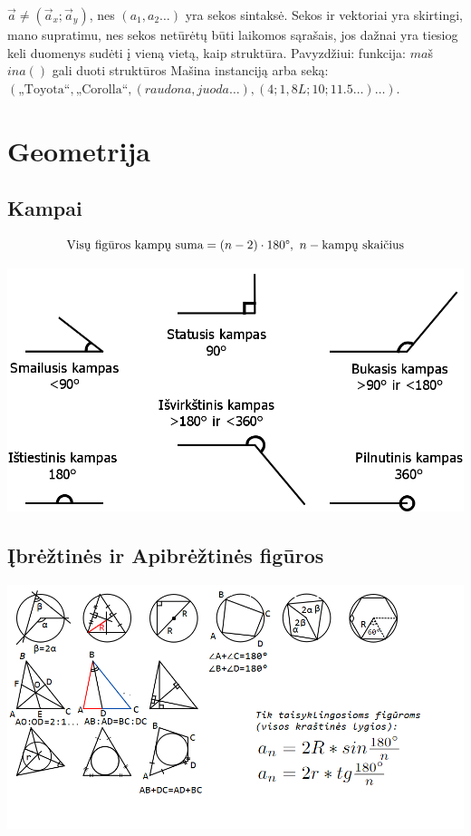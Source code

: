 \documentclass[fleqn]{article} %
\begin{document}
$\vec{a} \ne (\vec{a}_x; \vec{a}_y)$, nes $(a_1, a_2 \dots )$ yra sekos sintaksė. 
Sekos ir vektoriai yra skirtingi, mano supratimu, nes sekos netūrėtų būti laikomos sąrašais, jos dažnai yra tiesiog keli duomenys sudėti į vieną vietą, kaip struktūra. 
Pavyzdžiui: funkcija: $ma$š$ina()$ gali duoti struktūros Mašina instanciją arba seką: 
$(\text{„Toyota“}, \text{„Corolla“}, (raudona, juoda \dots), (4; 1,8L; 10; 11.5 \dots) \dots)$.

\clearpage

\section{Geometrija}

\subsection{Kampai}

\begin{equation}
    \text{Visų figūros kampų suma} = (n - 2) \cdot 180\degree,\ n - \text{kampų skaičius}
\end{equation}

\includegraphics[max width=\textwidth]{assets/angle_types.png}

\subsection{Įbrėžtinės ir Apibrėžtinės figūros}

\includegraphics[max width = \textwidth]{assets/geometry.png}
\end{document}
